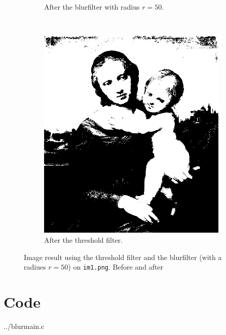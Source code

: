 \documentclass[two column]{article}
\begin{document}
\begin{figure}[h]
\begin{subfigure}{0.3\textwidth}
    \caption{After the blurfilter with radius $r = 50$.}
  \end{subfigure}
  ~%
  \begin{subfigure}{0.3\textwidth}
    \includegraphics[width=\textwidth]{test.png}
    \caption{After the threshold filter.}
  \end{subfigure}
  \caption{Image result using the threshold filter and the blurfilter
    (with a radiues $r = 50$) on 
    \texttt{im1.png}. Before and after}
  \label{fig:thres}
\end{figure}



\clearpage
\onecolumn
\section*{Code}
\label{sec:code}


{../blurmain.c}

\clearpage


\end{document}
